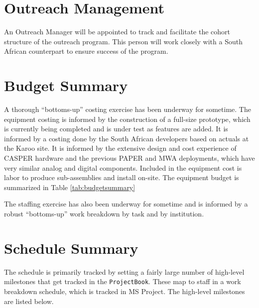 \documentclass[preprint]{aastex}
\begin{document}
\section{Outreach Management}
An Outreach Manager will be appointed to track and facilitate the cohort structure of the outreach program.
This person will work closely with a South African counterpart to ensure success of the program.  


\section{Budget Summary}
\label{sec:budget}
A thorough ``bottoms-up'' costing exercise has been underway for sometime. The equipment
costing is informed by the construction of a full-size prototype, which is currently
being completed and is under test as features are added. It is informed by a costing
done by the South African developers based on actuals at the Karoo site. It is
informed by the extensive design and cost experience of CASPER hardware and the
previous PAPER and MWA deployments, which have very similar analog and digital components.
Included in the equipment cost is labor to produce sub-assemblies and install on-site.
The equipment budget is summarized in Table \ref{tab:budgetsummary}


The staffing exercise has also been underway for sometime and is informed by a robust
``bottoms-up'' work breakdown by task and by institution.



\section{Schedule Summary}
\label{sec:schedule}
The schedule is primarily tracked by setting a fairly large number of high-level
milestones that get tracked in the {\tt ProjectBook}. These map to staff in a work
breakdown schedule, which is tracked in MS Project. The high-level milestones are
listed below.
\end{document}
